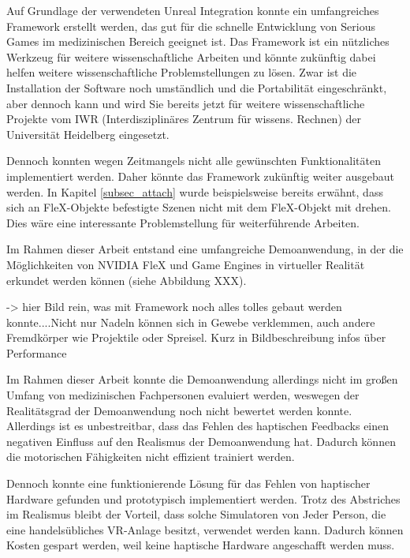 Auf Grundlage der verwendeten Unreal Integration konnte ein umfangreiches Framework erstellt  werden, das gut für die schnelle Entwicklung von Serious Games im medizinischen Bereich geeignet ist. 
Das Framework ist ein nützliches Werkzeug für weitere wissenschaftliche Arbeiten und könnte zukünftig dabei helfen weitere wissenschaftliche Problemstellungen zu lösen. Zwar ist die Installation der Software noch umständlich  und die Portabilität eingeschränkt, aber dennoch kann und wird Sie bereits jetzt für weitere wissenschaftliche Projekte vom IWR (Interdisziplinäres Zentrum für wissens. Rechnen) der Universität Heidelberg eingesetzt. 

Dennoch konnten wegen Zeitmangels nicht alle gewünschten Funktionalitäten implementiert werden. Daher könnte das Framework zukünftig weiter ausgebaut werden. In Kapitel \ref{subsec_attach} wurde beispielsweise bereits erwähnt, dass sich an FleX-Objekte befestigte Szenen nicht mit dem FleX-Objekt mit drehen. Dies wäre eine interessante Problemstellung für weiterführende Arbeiten.

Im Rahmen dieser Arbeit entstand eine umfangreiche Demoanwendung, in der die Möglichkeiten von NVIDIA FleX und Game Engines in virtueller Realität erkundet werden können (siehe Abbildung XXX). 

-> hier Bild rein, was mit Framework noch alles tolles gebaut werden konnte....Nicht nur Nadeln können sich in Gewebe verklemmen, auch andere Fremdkörper wie Projektile oder Spreisel. Kurz in Bildbeschreibung infos über Performance

Im Rahmen dieser Arbeit konnte die Demoanwendung allerdings nicht im großen Umfang von medizinischen Fachpersonen evaluiert werden, weswegen der Realitätsgrad der Demoanwendung noch nicht bewertet werden konnte. 
Allerdings ist es unbestreitbar, dass das Fehlen des haptischen Feedbacks einen negativen Einfluss auf den Realismus der Demoanwendung hat. Dadurch können die motorischen Fähigkeiten nicht effizient trainiert werden. 

Dennoch konnte eine funktionierende Lösung für das Fehlen von haptischer Hardware gefunden und prototypisch implementiert werden. %
Trotz des Abstriches im Realismus bleibt der Vorteil, dass solche Simulatoren von Jeder Person, die eine handelsübliches VR-Anlage besitzt, verwendet werden kann. Dadurch können Kosten gespart werden, weil keine haptische Hardware angeschafft werden muss.

